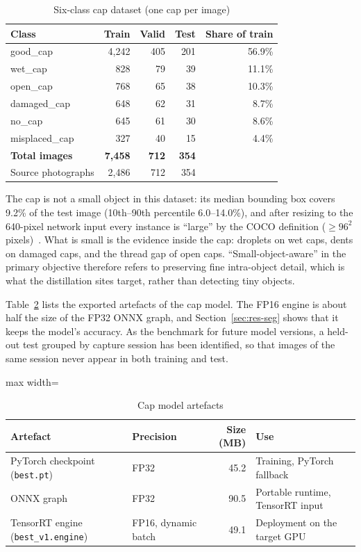 \begin{table}[htbp]
\centering
\caption{Six-class cap dataset (one cap per image)}
\label{tab:capdata}
\footnotesize
\begin{tabular}{|l|r|r|r|r|}
\hline
\textbf{Class} & \textbf{Train} & \textbf{Valid} & \textbf{Test} & \textbf{Share of train} \\ \hline
good\_cap & 4,242 & 405 & 201 & 56.9\% \\ \hline
wet\_cap & 828 & 79 & 39 & 11.1\% \\ \hline
open\_cap & 768 & 65 & 38 & 10.3\% \\ \hline
damaged\_cap & 648 & 62 & 31 & 8.7\% \\ \hline
no\_cap & 645 & 61 & 30 & 8.6\% \\ \hline
misplaced\_cap & 327 & 40 & 15 & 4.4\% \\ \hline
\textbf{Total images} & \textbf{7,458} & \textbf{712} & \textbf{354} & \\ \hline
Source photographs & 2,486 & 712 & 354 & \\ \hline
\end{tabular}
\end{table}

The cap is not a small object in this dataset: its median bounding box covers 9.2\% of the test image (10th--90th percentile 6.0--14.0\%), and after resizing to the 640-pixel network input every instance is ``large'' by the COCO definition ($\geq96^2$ pixels)~\cite{lin2014coco}. What is small is the evidence inside the cap: droplets on wet caps, dents on damaged caps, and the thread gap of open caps. ``Small-object-aware'' in the primary objective therefore refers to preserving fine intra-object detail, which is what the distillation sites target, rather than detecting tiny objects.

Table~\ref{tab:artefacts} lists the exported artefacts of the cap model. The FP16 engine is about half the size of the FP32 ONNX graph, and Section~\ref{sec:res-seg} shows that it keeps the model's accuracy. As the benchmark for future model versions, a held-out test grouped by capture session has been identified, so that images of the same session never appear in both training and test.

\begin{table}[htbp]
\centering
\caption{Cap model artefacts}
\label{tab:artefacts}
\footnotesize
\begin{adjustbox}{max width=\textwidth}
\begin{tabular}{|l|l|r|l|}
\hline
\textbf{Artefact} & \textbf{Precision} & \textbf{Size (MB)} & \textbf{Use} \\ \hline
PyTorch checkpoint (\texttt{best.pt}) & FP32 & 45.2 & Training, PyTorch fallback \\ \hline
ONNX graph & FP32 & 90.5 & Portable runtime, TensorRT input \\ \hline
TensorRT engine (\texttt{best\_v1.engine}) & FP16, dynamic batch & 49.1 & Deployment on the target GPU \\ \hline
\end{tabular}
\end{adjustbox}
\end{table}

